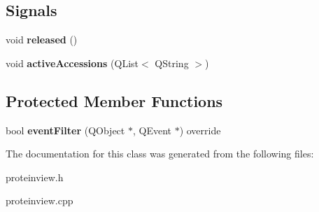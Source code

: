 \subsection*{Signals}
\begin{DoxyCompactItemize}
\item 
\mbox{\label{class_protein_view_a3293f5d199157bce7e98ea78171635c5}} 
void {\bfseries released} ()
\item 
\mbox{\label{class_protein_view_aea998af0dc44d2636dab2f8bdba07a66}} 
void {\bfseries active\+Accessions} (Q\+List$<$ Q\+String $>$)
\end{DoxyCompactItemize}
\subsection*{Protected Member Functions}
\begin{DoxyCompactItemize}
\item 
\mbox{\label{class_protein_view_ad6a88c7d11cfd0fef51f5e3da4cf3476}} 
bool {\bfseries event\+Filter} (Q\+Object $\ast$, Q\+Event $\ast$) override
\end{DoxyCompactItemize}


The documentation for this class was generated from the following files\+:\begin{DoxyCompactItemize}
\item 
proteinview.\+h\item 
proteinview.\+cpp\end{DoxyCompactItemize}
